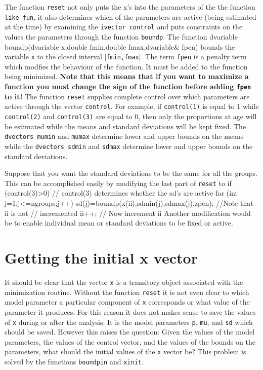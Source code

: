 \documentclass[12pt]{book}
\begin{document}
The function {\tt reset} not only puts the x's into the parameters of the
the function {\tt like\_fun}, it also determines which of the parameters
are active (being estimated at the time) by examining the
{\tt ivector control} and puts constraints on the values the
parameters through the function {\tt boundp}.
The function
\beginexample
dvariable boundp(dvariable x,double fmin,double fmax,dvariable& fpen)
\endexample
{}
\noindent bounds the variable {\tt x} to the closed interval 
$[${\tt fmin,fmax}$]$.
The term {\tt fpen} is a penalty term which modfies the behaviour of the
function. It must be added to the function being minimized.
{\bf Note that this means that if you want to maximize a function you must
change the sign of the function before adding {\tt fpen} to it!} 
The function {\tt reset} supplies complete control over which parameters
are active through the vector {\tt control}.  For example,
if {\tt control(1)} is equal to 1 while {\tt control(2)} and 
{\tt control(3)} are equal to 0, then only the proportions at age will
be estimated while the means and standard deviations will be kept fixed.
The {\tt dvectors mumin} and {\tt mumax} determine lower and upper
bounds on the means while 
the {\tt dvectors sdmin} and {\tt sdmax} determine lower and upper
bounds on the standard deviations. 

Suppose that you want the standard deviations to be the same for all the
groups. This can be accomplished easily by modifying the last part of 
{\tt reset} to
\beginexample
  if (control(3)>0)  // control(3) determines whether the sd's are active
  {
    for (int j=1;j<=ngroups;j++)    
    {
      sd(j)=boundp(x(ii),sdmin(j),sdmax(j),zpen); //Note that ii is not
                                                  // incremented
    }
    ii++;   // Now increment ii
  }
\endexample
Another modification would be to enable individual mean or standard 
deviations to be fixed or active.
\section{Getting the initial x vector}
It should be clear that the vector {\tt x} is a transitory object
associated with the minimization routine. Without the function {\tt reset}
it is not even clear to which model parameter a particular component
of {\tt x} corresponds or what value of the parameter it produces.
For this reason it does not makes sense to save the values of
{\tt x}  during or after the analysis. It is the model
parameters {\tt p}, {\tt mu}, and {\tt sd} which should be saved.
However this raises the question: Given the values of the
model parameters, the values of the control vector, and the
values of the bounds on the parameters, what should the initial values 
of the {\tt x} vector be? This problem is solved by the functions
{\tt boundpin} and {\tt xinit}.
\end{document}
